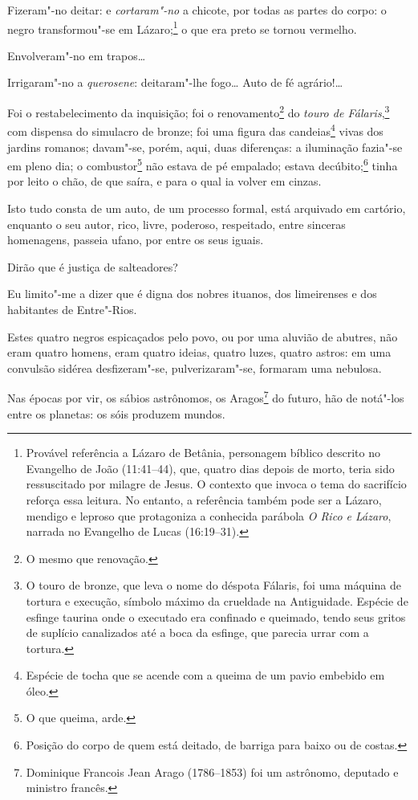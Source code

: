 Fizeram"-no deitar: e \emph{cortaram"-no} a chicote, por todas as partes
do corpo: o negro transformou"-se em Lázaro;\footnote{Provável
  referência a Lázaro de Betânia, personagem bíblico descrito no
  Evangelho de João (11:41--44), que, quatro dias depois de morto, teria
  sido ressuscitado por milagre de Jesus. O contexto que invoca o tema
  do sacrifício reforça essa leitura. No entanto, a
  referência também pode ser a Lázaro, mendigo e leproso que protagoniza
  a conhecida parábola \emph{O Rico e Lázaro}, narrada no Evangelho de
  Lucas (16:19--31).} o que era preto se tornou vermelho.

Envolveram"-no em trapos\ldots{}

Irrigaram"-no a \emph{querosene}: deitaram"-lhe fogo\ldots{} Auto de fé
agrário!\ldots{}

Foi o restabelecimento da inquisição; foi o renovamento\footnote{O
  mesmo que renovação.} do \emph{touro de Fálaris},\footnote{O touro de
  bronze, que leva o nome do déspota Fálaris, foi uma máquina de tortura
  e execução, símbolo máximo da crueldade na Antiguidade. Espécie de
  esfinge taurina onde o executado era confinado e queimado, tendo seus
  gritos de suplício canalizados até a boca da esfinge, que parecia
  urrar com a tortura.} com dispensa do simulacro de bronze; foi uma
figura das candeias\footnote{Espécie de tocha que se acende com a
  queima de um pavio embebido em óleo.} vivas dos jardins romanos;
davam"-se, porém, aqui, duas diferenças: a iluminação fazia"-se em pleno
dia; o combustor\footnote{O que queima, arde.} não estava de pé
empalado; estava decúbito;\footnote{Posição do corpo de quem está
  deitado, de barriga para baixo ou de costas.} tinha por leito o chão,
de que saíra, e para o qual ia volver em cinzas.

Isto tudo consta de um auto, de um processo formal, está arquivado em
cartório, enquanto o seu autor, rico, livre, poderoso, respeitado, entre
sinceras homenagens, passeia ufano, por entre os seus iguais.

Dirão que é justiça de salteadores?

Eu limito"-me a dizer que é digna dos nobres ituanos, dos limeirenses e
dos habitantes de Entre"-Rios.

Estes quatro negros espicaçados pelo povo, ou por uma aluvião de
abutres, não eram quatro homens, eram quatro ideias, quatro luzes,
quatro astros: em uma convulsão sidérea desfizeram"-se, pulverizaram"-se,
formaram uma nebulosa.

Nas épocas por vir, os sábios astrônomos, os Aragos\footnote{Dominique
  Francois Jean Arago (1786--1853) foi um astrônomo, deputado e ministro
  francês.} do futuro, hão
de notá"-los entre os planetas: os sóis produzem mundos.

